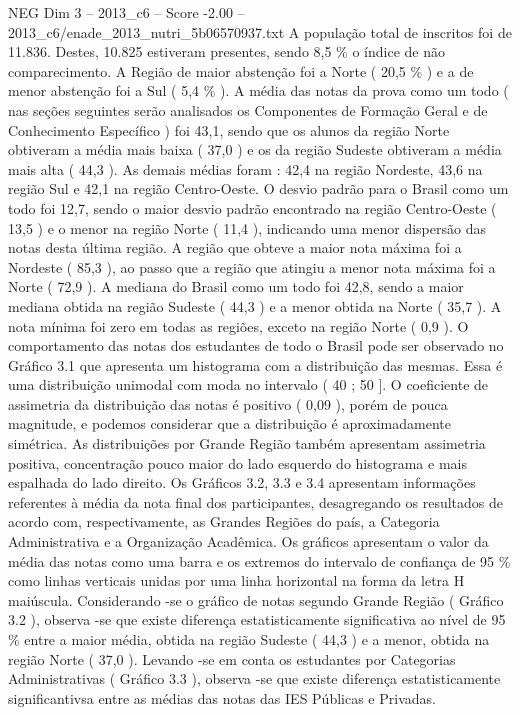 \begin{textsample}{NEG Dim 3 – 2013\_c6 – Score -2.00 – 2013\_c6/enade\_2013\_nutri\_5b06570937.txt}
A população total de inscritos foi de 11.836.
Destes, 10.825 estiveram presentes, sendo 8,5 \% o índice de não comparecimento.
A Região de maior abstenção foi a Norte ( 20,5 \% ) e a de menor abstenção foi a Sul ( 5,4 \% ).
A média das notas da prova como um todo ( nas seções seguintes serão analisados os Componentes de Formação Geral e de Conhecimento Específico ) foi 43,1, sendo que os alunos da região Norte obtiveram a média mais baixa ( 37,0 ) e os da região Sudeste obtiveram a média mais alta ( 44,3 ).
As demais médias foram : 42,4 na região Nordeste, 43,6 na região Sul e 42,1 na região Centro-Oeste.
O desvio padrão para o Brasil como um todo foi 12,7, sendo o maior desvio padrão encontrado na região Centro-Oeste ( 13,5 ) e o menor na região Norte ( 11,4 ), indicando uma menor dispersão das notas desta última região.
A região que obteve a maior nota máxima foi a Nordeste ( 85,3 ), ao passo que a região que atingiu a menor nota máxima foi a Norte ( 72,9 ).
A mediana do Brasil como um todo foi 42,8, sendo a maior mediana obtida na região Sudeste ( 44,3 ) e a menor obtida na Norte ( 35,7 ).
A nota mínima foi zero em todas as regiões, exceto na região Norte ( 0,9 ).
O comportamento das notas dos estudantes de todo o Brasil pode ser observado no Gráfico 3.1 que apresenta um histograma com a distribuição das mesmas.
Essa é uma distribuição unimodal com moda no intervalo ( 40 ; 50 ].
O coeficiente de assimetria da distribuição das notas é positivo ( 0,09 ), porém de pouca magnitude, e podemos considerar que a distribuição é aproximadamente simétrica.
As distribuições por Grande Região também apresentam assimetria positiva, concentração pouco maior do lado esquerdo do histograma e mais espalhada do lado direito.
Os Gráficos 3.2, 3.3 e 3.4 apresentam informações referentes à média da nota final dos participantes, desagregando os resultados de acordo com, respectivamente, as Grandes Regiões do país, a Categoria Administrativa e a Organização Acadêmica.
Os gráficos apresentam o valor da média das notas como uma barra e os extremos do intervalo de confiança de 95 \% como linhas verticais unidas por uma linha horizontal na forma da letra H maiúscula.
Considerando -se o gráfico de notas segundo Grande Região ( Gráfico 3.2 ), observa -se que existe diferença estatisticamente significativa ao nível de 95 \% entre a maior média, obtida na região Sudeste ( 44,3 ) e a menor, obtida na região Norte ( 37,0 ).
Levando -se em conta os estudantes por Categorias Administrativas ( Gráfico 3.3 ), observa -se que existe diferença estatisticamente significantivsa entre as médias das notas das IES Públicas e Privadas.

\end{textsample}
